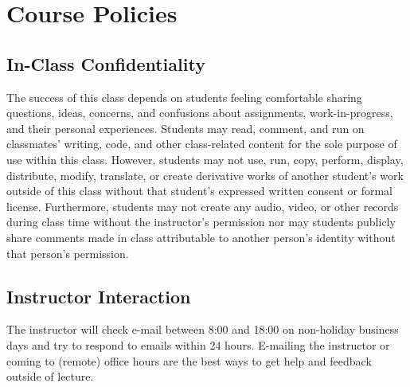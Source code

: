 \documentclass[10pt]{memoir}
\begin{document}
\section{\textbf{Course Policies}}


\subsection{In-Class Confidentiality}
The success of this class depends on students feeling comfortable sharing questions, ideas, concerns, and confusions about assignments, work-in-progress, and their personal experiences. Students may read, comment, and run on classmates' writing, code, and other class-related content for the sole purpose of use within this class. However, students may not use, run, copy, perform, display, distribute, modify, translate, or create derivative works of another student's work outside of this class without that student's expressed written consent or formal license. Furthermore, students may not create any audio, video, or other records during class time without the instructor's permission nor may students publicly share comments made in class attributable to another person's identity without that person's permission.


\subsection{Instructor Interaction}
The instructor will check e-mail between 8:00 and 18:00 on non-holiday business days and try to respond to emails within 24 hours. E-mailing the instructor or coming to (remote) office hours are the best ways to get help and feedback outside of lecture.
\end{document}
